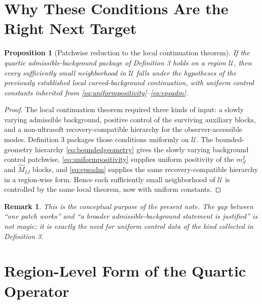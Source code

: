 \documentclass[11pt]{article}
\newtheorem{proposition}{Proposition}
\newtheorem{remark}{Remark}
\begin{document}
\section{Why These Conditions Are the Right Next Target}

\begin{proposition}[Patchwise reduction to the local continuation theorem]
If the quartic admissible-background package of Definition 3 holds on a region \(\mathcal U\), then every sufficiently small neighborhood in \(\mathcal U\) falls under the hypotheses of the previously established local curved-background continuation, with uniform control constants inherited from \eqref{eq:uniformpositivity}--\eqref{eq:epsadm}.
\end{proposition}

\begin{proof}
The local continuation theorem required three kinds of input: a slowly varying admissible background, positive control of the surviving auxiliary blocks, and a non-ultrasoft recovery-compatible hierarchy for the observer-accessible modes. Definition 3 packages those conditions uniformly on \(\mathcal U\). The bounded-geometry hierarchy \eqref{eq:boundedgeometry} gives the slowly varying background control patchwise, \eqref{eq:uniformpositivity} supplies uniform positivity of the \(m_S^2\) and \(\widehat M_{IJ}\) blocks, and \eqref{eq:epsadm} supplies the same recovery-compatible hierarchy in a region-wise form. Hence each sufficiently small neighborhood of \(\mathcal U\) is controlled by the same local theorem, now with uniform constants.
\end{proof}

\begin{remark}
This is the conceptual purpose of the present note. The gap between ``one patch works'' and ``a broader admissible-background statement is justified'' is not magic; it is exactly the need for uniform control data of the kind collected in Definition 3.
\end{remark}

\section{Region-Level Form of the Quartic Operator}
\end{document}
